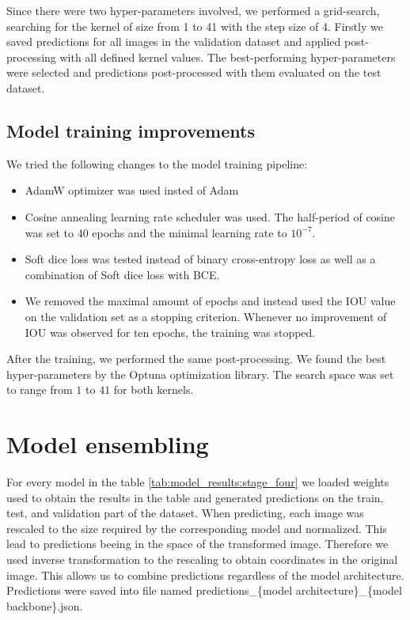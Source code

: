 Since there were two hyper-parameters involved, we performed a grid-search, searching for the kernel of size from 1 to 41 with the step size of 4. Firstly we saved predictions for all images in the validation dataset and applied post-processing with all defined kernel values. The best-performing hyper-parameters were selected and predictions post-processed with them evaluated on the test dataset.

\subsection{Model training improvements}
We tried the following changes to the model training pipeline:
\begin{itemize}
    \item AdamW optimizer was used insted of Adam
    \item Cosine annealing learning rate scheduler was used. The half-period of cosine was set to 40 epochs and the minimal learning rate to $10^{-7}$.
    \item Soft dice loss was tested instead of binary cross-entropy loss as well as a combination of Soft dice loss with BCE.
    \item We removed the maximal amount of epochs and instead used the IOU value on the validation set as a stopping criterion. Whenever no improvement of IOU was observed for ten epochs, the training was stopped.
\end{itemize}

After the training, we performed the same post-processing. We found the best hyper-parameters by the Optuna optimization library. The search space was set to range from $1$ to $41$ for both kernels.




\section{Model ensembling}
\label{sec:model_ensemling}

For every model in the table \ref{tab:model_results:stage_four} we loaded weights used to obtain the results in the table and generated predictions on the train, test, and validation part of the dataset. When predicting, each image was rescaled to the size required by the corresponding model and normalized. This lead to predictions beeing in the space of the transformed image. Therefore we used inverse transformation to the rescaling to obtain coordinates in the original image. This allows us to combine predictions regardless of the model architecture.
Predictions were saved into file named predictions\_\{model architecture\}\_\{model backbone\}.json.

